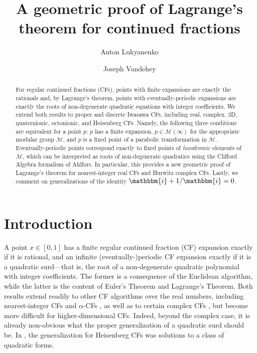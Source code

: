 \documentclass[reqno,10pt]{amsart}
\title[Lagrange's Theorem]{A geometric proof of Lagrange's theorem for continued fractions}
\author[A. Lukyanenko]{Anton Lukyanenko}
\author[J. Vandehey]{Joseph Vandehey}
\newcommand{\ii}{\mathbbm{i}}
\numberwithin{thm}{section}
\theoremstyle{definition}
\theoremstyle{definition}
\numberwithin{equation}{section}
\begin{document}
\begin{abstract}
    For regular continued fractions (CFs), points with finite expansions are exactly the rationals and, by Lagrange's theorem, points with eventually-periodic expansions are exactly the roots of non-degenerate quadratic equations with integer coefficients. We extend both results to proper and discrete Iwasawa CFs, including real, complex, 3D, quaternionic, octonionic, and Heisenberg CFs. Namely, the following three conditions are equivalent for a point $p$: $p$ has a finite expansion, $p\in \mathcal M(\infty)$ for the appropriate modular group $\mathcal M$, and $p$ is a fixed point of a parabolic transformation in $\mathcal M$. Eventually-periodic points correspond exactly to fixed points of \emph{loxodromic} elements of $\mathcal M$, which can be interpreted as roots of non-degenerate quadratics using the Clifford Algebra formalism of Ahlfors. In particular, this provides a new geometric proof of Lagrange's theorem for nearest-integer real CFs and Hurwitz complex CFs. Lastly, we comment on generalizations of the identity $\ii+1/\ii=0$.
\end{abstract}
    


\maketitle
\section{Introduction}
\label{sec:intro}


A point $x\in [0,1]$ has a finite regular continued fraction (CF) expansion exactly if it is rational, and an infinite (eventually-)periodic CF expansion exactly if it is a quadratic surd---that is, the root of a non-degenerate quadratic polynomial with integer coefficients. The former is a consequence of the Euclidean algorithm, while the latter is the content of Euler's Theorem and Lagrange's Theorem. Both results extend readily to other CF algorithms over the real numbers, including nearest-integer CFs and $\alpha$-CFs \cite{beltz2014periodicity}, as well as to certain complex CFs \cite{Dani2015}, but become more difficult for higher-dimensional CFs. Indeed, beyond the complex case, it is already non-obvious what the proper generalization of a quadratic surd should be. In \cite{vandehey2015lagrange}, the generalization for Heisenberg CFs was solutions to a class of quadratic forms.
\end{document}
